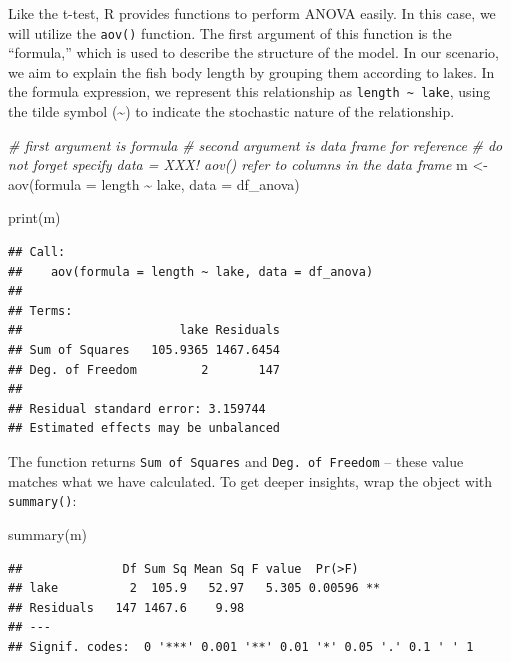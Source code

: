 \documentclass[
]{article}
\newenvironment{Shaded}{\begin{snugshade}}{\end{snugshade}}
\newcommand{\AttributeTok}[1]{\textcolor[rgb]{0.77,0.63,0.00}{#1}}
\newcommand{\CommentTok}[1]{\textcolor[rgb]{0.56,0.35,0.01}{\textit{#1}}}
\newcommand{\FunctionTok}[1]{\textcolor[rgb]{0.00,0.00,0.00}{#1}}
\newcommand{\NormalTok}[1]{#1}
\newcommand{\OtherTok}[1]{\textcolor[rgb]{0.56,0.35,0.01}{#1}}
\newcommand{\SpecialCharTok}[1]{\textcolor[rgb]{0.00,0.00,0.00}{#1}}
\begin{document}
Like the t-test, R provides functions to perform ANOVA easily. In this case, we will utilize the \texttt{aov()} function. The first argument of this function is the ``formula,'' which is used to describe the structure of the model. In our scenario, we aim to explain the fish body length by grouping them according to lakes. In the formula expression, we represent this relationship as \texttt{length\ \textasciitilde{}\ lake}, using the tilde symbol (\textasciitilde) to indicate the stochastic nature of the relationship.

\begin{Shaded}
\begin{Highlighting}[]
\CommentTok{\# first argument is formula}
\CommentTok{\# second argument is data frame for reference}
\CommentTok{\# do not forget specify data = XXX! aov() refer to columns in the data frame}
\NormalTok{m }\OtherTok{\textless{}{-}} \FunctionTok{aov}\NormalTok{(}\AttributeTok{formula =}\NormalTok{ length }\SpecialCharTok{\textasciitilde{}}\NormalTok{ lake,}
         \AttributeTok{data =}\NormalTok{ df\_anova)}

\FunctionTok{print}\NormalTok{(m)}
\end{Highlighting}
\end{Shaded}

\begin{verbatim}
## Call:
##    aov(formula = length ~ lake, data = df_anova)
## 
## Terms:
##                      lake Residuals
## Sum of Squares   105.9365 1467.6454
## Deg. of Freedom         2       147
## 
## Residual standard error: 3.159744
## Estimated effects may be unbalanced
\end{verbatim}

The function returns \texttt{Sum\ of\ Squares} and \texttt{Deg.\ of\ Freedom} -- these value matches what we have calculated. To get deeper insights, wrap the object with \texttt{summary()}:

\begin{Shaded}
\begin{Highlighting}[]
\FunctionTok{summary}\NormalTok{(m)}
\end{Highlighting}
\end{Shaded}

\begin{verbatim}
##              Df Sum Sq Mean Sq F value  Pr(>F)   
## lake          2  105.9   52.97   5.305 0.00596 **
## Residuals   147 1467.6    9.98                   
## ---
## Signif. codes:  0 '***' 0.001 '**' 0.01 '*' 0.05 '.' 0.1 ' ' 1
\end{verbatim}
\end{document}
